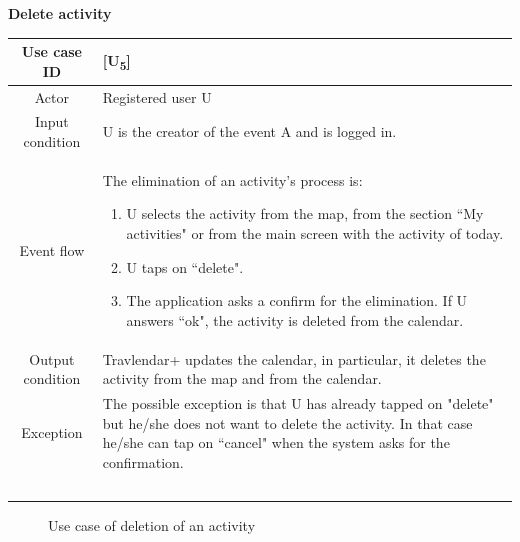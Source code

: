 \documentclass[12pt,titlepage]{article}
\begin{document}
\begin{flushleft}
\textbf{Delete activity}
\end{flushleft}

\begin{tabular}{cp{10cm}} 
Use case ID& {[U\textsubscript{5}]}\\ \hline
Actor&Registered user U \\ \hline 

Input condition&U is the creator of the event A and is logged in.\\ \hline
Event flow&The elimination of an activity's process is: 
\begin{enumerate}
\item U selects the activity from the map, from the section ``My activities" or from the main screen with the activity of today.
\item U taps on ``delete". 
\item The application asks a confirm for the elimination. If U answers ``ok", the activity is deleted from the calendar.
\end{enumerate}\\ \hline
Output condition& Travlendar+ updates the calendar, in particular, it deletes the activity from the map and from the calendar.
\\ \hline
Exception& The possible exception is that U has already tapped on "delete" but he/she does not want to delete the activity. In that case he/she can tap on ``cancel" when the system asks for the confirmation.
\\ \hline \

\end{tabular}
\pagebreak 
\begin{figure}
\centering
{}
\caption{Use case of deletion of an activity}

\end{figure}
\end{document}

